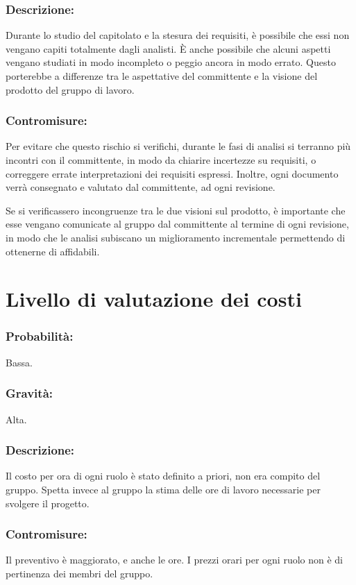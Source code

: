 \documentclass[a4paper]{report}
\begin{document}
			\subsubsection{Descrizione:}
				Durante lo studio del capitolato e la stesura dei requisiti, è possibile che essi non vengano 
				capiti totalmente dagli analisti. È anche possibile che alcuni aspetti vengano studiati in modo 
				incompleto o peggio ancora in modo errato. Questo porterebbe a differenze tra le aspettative del 
				committente e la visione del prodotto del gruppo di lavoro.
			\subsubsection{Contromisure:}
				Per evitare che questo rischio si verifichi, durante le fasi di analisi si terranno più incontri 
				con il committente, in modo da chiarire incertezze su requisiti, o correggere errate interpretazioni 
				dei requisiti espressi. Inoltre, ogni documento verrà consegnato e valutato dal committente, ad ogni 
				revisione.
				
				Se si verificassero incongruenze tra le due visioni sul prodotto, è importante che esse vengano comunicate 
				al gruppo dal committente al termine di ogni revisione, in modo che le analisi subiscano un miglioramento 
				incrementale permettendo di ottenerne di affidabili.
		\section{Livello di valutazione dei costi}
			\subsubsection{Probabilità:}
				Bassa.
			\subsubsection{Gravità:}
				Alta.
			\subsubsection{Descrizione:}
				Il costo per ora di ogni ruolo è stato definito a priori, non era compito del gruppo. Spetta invece al 
				gruppo la stima delle ore di lavoro necessarie per svolgere il progetto.
			\subsubsection{Contromisure:}
				Il preventivo è maggiorato, e anche le ore. I prezzi orari per ogni ruolo non è di pertinenza dei membri 
				del gruppo.
\end{document}
